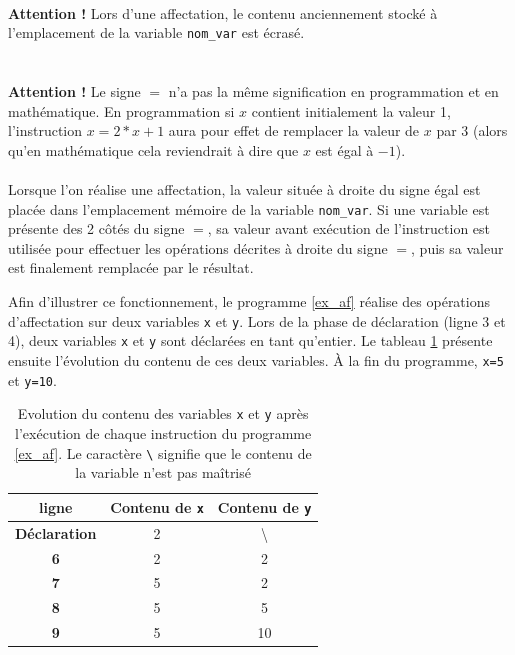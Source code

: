 \documentclass[a4paper,11pt]{book}
\newenvironment{warning} 
   {~\\ \textbf{Attention !}}{\\}
\theoremstyle{definition}
\begin{document}
\begin{warning}
Lors d'une affectation, le contenu anciennement stocké à l'emplacement de la variable \texttt{nom\_var} est écrasé.
\end{warning}
~\\
\begin{warning}
Le signe $=$ n'a pas la même signification en programmation et en mathématique. En programmation si $x$ contient initialement la valeur 1,  l'instruction $x=2*x+1$ aura pour effet de remplacer la valeur de $x$ par $3$ (alors qu'en mathématique cela reviendrait à dire que $x$ est égal à $-1$).
\end{warning}
~\\

Lorsque l'on réalise une affectation, la valeur située à droite du signe égal est placée dans l'emplacement mémoire de la variable \texttt{nom\_var}. Si une variable est présente des 2 côtés du signe $=$, sa valeur avant exécution de l'instruction est utilisée pour effectuer les opérations décrites à droite du signe $=$, puis sa valeur est finalement remplacée par le résultat.

Afin d'illustrer ce fonctionnement, le programme \ref{ex_af} réalise des opérations d'affectation sur deux variables \texttt{x} et \texttt{y}. Lors de la phase de déclaration (ligne 3 et 4), deux variables \texttt{x} et \texttt{y} sont déclarées en tant qu'entier. Le tableau \ref{t_aff} présente ensuite l'évolution du contenu de ces deux variables. \`A la fin du programme, \texttt{x=5} et \texttt{y=10}. 



\begin{table}[t]
\centering
\begin{tabular}{ccc}
  \hline
  \textbf{ligne} & Contenu de \texttt{x} & Contenu de \texttt{y}\\
  \hline
  \textbf{Déclaration}&2& \textbackslash\\
  \textbf{6}&2&2\\
  \textbf{7}&5&2\\
  \textbf{8}&5&5\\
  \textbf{9}&5&10\\
  \hline
\end{tabular}
\caption{Evolution du contenu des variables \texttt{x} et \texttt{y} après l'exécution de chaque instruction du programme \ref{ex_af}. Le caractère \texttt{\textbackslash} signifie que le contenu de la variable n'est pas maîtrisé\label{t_aff}}
\end{table}
\end{document}

